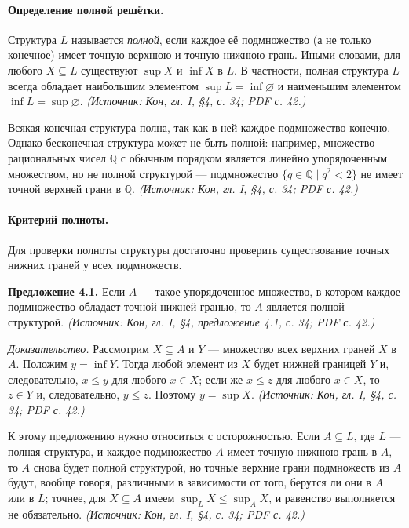 \documentclass[a4paper,12pt]{article}
\begin{document}
\paragraph{Определение полной решётки.}
Структура \(L\) называется \emph{полной}, если каждое её подмножество (а не только конечное) имеет точную верхнюю и точную нижнюю грань. Иными словами, для любого \(X\subseteq L\) существуют \(\sup X\) и \(\inf X\) в \(L\). В частности, полная структура \(L\) всегда обладает наибольшим элементом \(\sup L=\inf\varnothing\) и наименьшим элементом \(\inf L=\sup\varnothing\).
\textit{(Источник: Кон, гл. I, §4, с. 34; PDF с. 42.)}

Всякая конечная структура полна, так как в ней каждое подмножество конечно. Однако бесконечная структура может не быть полной: например, множество рациональных чисел \(\mathbb{Q}\) с обычным порядком является линейно упорядоченным множеством, но не полной структурой — подмножество \(\{q\in\mathbb{Q}\mid q^2<2\}\) не имеет точной верхней грани в \(\mathbb{Q}\).
\textit{(Источник: Кон, гл. I, §4, с. 34; PDF с. 42.)}

\paragraph{Критерий полноты.}
Для проверки полноты структуры достаточно проверить существование точных нижних граней у всех подмножеств.

\textbf{Предложение 4.1.} Если \(A\) — такое упорядоченное множество, в котором каждое подмножество обладает точной нижней гранью, то \(A\) является полной структурой.
\textit{(Источник: Кон, гл. I, §4, предложение 4.1, с. 34; PDF с. 42.)}

\emph{Доказательство.} Рассмотрим \(X\subseteq A\) и \(Y\) — множество всех верхних граней \(X\) в \(A\). Положим \(y=\inf Y\). Тогда любой элемент из \(X\) будет нижней границей \(Y\) и, следовательно, \(x\le y\) для любого \(x\in X\); если же \(x\le z\) для любого \(x\in X\), то \(z\in Y\) и, следовательно, \(y\le z\). Поэтому \(y=\sup X\).
\textit{(Источник: Кон, гл. I, §4, с. 34; PDF с. 42.)}

К этому предложению нужно относиться с осторожностью. Если \(A\subseteq L\), где \(L\) — полная структура, и каждое подмножество \(A\) имеет точную нижнюю грань в \(A\), то \(A\) снова будет полной структурой, но точные верхние грани подмножеств из \(A\) будут, вообще говоря, различными в зависимости от того, берутся ли они в \(A\) или в \(L\); точнее, для \(X\subseteq A\) имеем \(\sup_L X\le\sup_A X\), и равенство выполняется не обязательно.
\textit{(Источник: Кон, гл. I, §4, с. 34; PDF с. 42.)}
\end{document}
